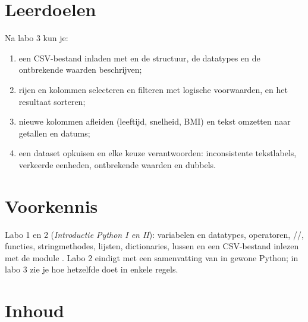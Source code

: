 \documentclass[11pt,a4paper]{article}
\begin{document}



\section{Leerdoelen}

Na labo 3 kun je:

\begin{enumerate}[label=\textbf{LD\arabic*}, leftmargin=1.4cm]
  \item een CSV-bestand inladen met  en de structuur, de
        datatypes en de ontbrekende waarden beschrijven;
  \item rijen en kolommen selecteren en filteren met logische
        voorwaarden, en het resultaat sorteren;
  \item nieuwe kolommen afleiden (leeftijd, snelheid, BMI) en tekst
        omzetten naar getallen en datums;
  \item een dataset opkuisen en elke keuze verantwoorden: inconsistente
        tekstlabels, verkeerde eenheden, ontbrekende waarden en dubbels.
\end{enumerate}

\section{Voorkennis}

Labo 1 en 2 (\emph{Introductie Python I en II}): variabelen en datatypes,
operatoren, //, functies,
stringmethodes, lijsten, dictionaries, lussen en een CSV-bestand inlezen
met de module . Labo 2 eindigt met een samenvatting van
 in gewone Python; in labo 3 zie je hoe 
hetzelfde doet in enkele regels.





\section{Inhoud}
\end{document}
